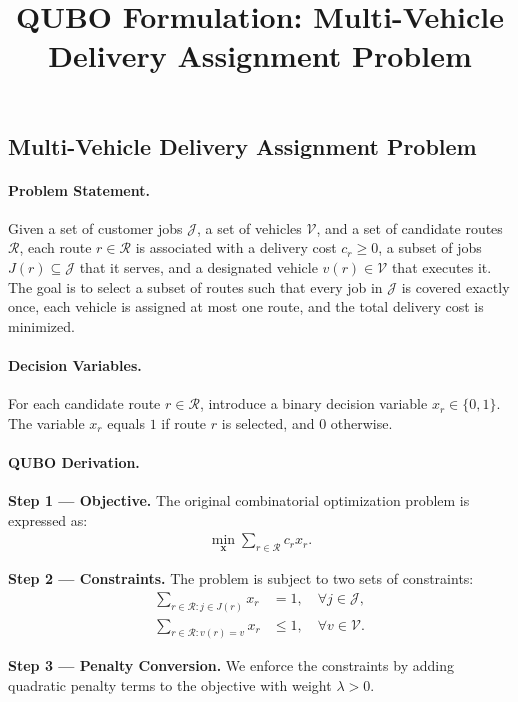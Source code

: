 \documentclass[12pt]{article}
\title{QUBO Formulation: Multi-Vehicle Delivery Assignment Problem}
\date{}
\begin{document}
\maketitle

\subsection*{Multi-Vehicle Delivery Assignment Problem}

\paragraph{Problem Statement.}
Given a set of customer jobs $\mathcal{J}$, a set of vehicles $\mathcal{V}$, and a set of candidate routes $\mathcal{R}$, each route $r \in \mathcal{R}$ is associated with a delivery cost $c_r \ge 0$, a subset of jobs $J(r) \subseteq \mathcal{J}$ that it serves, and a designated vehicle $v(r) \in \mathcal{V}$ that executes it. The goal is to select a subset of routes such that every job in $\mathcal{J}$ is covered exactly once, each vehicle is assigned at most one route, and the total delivery cost is minimized.

\paragraph{Decision Variables.}
For each candidate route $r \in \mathcal{R}$, introduce a binary decision variable $x_r \in \{0,1\}$. The variable $x_r$ equals $1$ if route $r$ is selected, and $0$ otherwise.

\paragraph{QUBO Derivation.}
\textbf{Step 1 --- Objective.} The original combinatorial optimization problem is expressed as:
\begin{align}
\min_{\mathbf{x}} \sum_{r \in \mathcal{R}} c_r x_r.
\end{align}

\textbf{Step 2 --- Constraints.} The problem is subject to two sets of constraints:
\begin{align}
\sum_{r \in \mathcal{R}: j \in J(r)} x_r &= 1, \quad \forall j \in \mathcal{J}, \tag{C1} \\
\sum_{r \in \mathcal{R}: v(r) = v} x_r &\le 1, \quad \forall v \in \mathcal{V}. \tag{C2}
\end{align}

\textbf{Step 3 --- Penalty Conversion.} We enforce the constraints by adding quadratic penalty terms to the objective with weight $\lambda > 0$.
\end{document}
